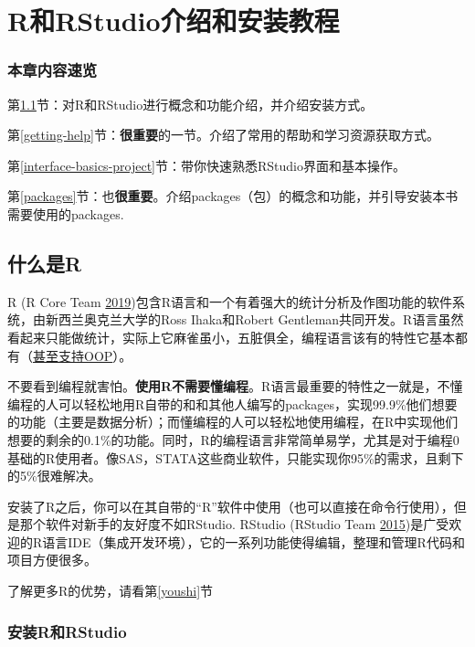 \documentclass[]{book}
\begin{document}
\hypertarget{intro-and-installation}{%
\chapter{R和RStudio介绍和安装教程}\label{intro-and-installation}}

\hypertarget{intro-overview}{%
\subsection*{本章内容速览}\label{intro-overview}}

第\ref{what-is-R}节：对R和RStudio进行概念和功能介绍，并介绍安装方式。

第\ref{getting-help}节：\textbf{很重要}的一节。介绍了常用的帮助和学习资源获取方式。

第\ref{interface-basics-project}节：带你快速熟悉RStudio界面和基本操作。

第\ref{packages}节：也\textbf{很重要}。介绍packages（包）的概念和功能，并引导安装本书需要使用的packages.

\hypertarget{what-is-R}{%
\section{什么是R}\label{what-is-R}}

R (R Core Team \protect\hyperlink{ref-R-base}{2019})包含R语言和一个有着强大的统计分析及作图功能的软件系统，由新西兰奥克兰大学的Ross Ihaka和Robert Gentleman共同开发。R语言虽然看起来只能做统计，实际上它麻雀虽小，五脏俱全，编程语言该有的特性它基本都有（\href{https://adv-r.hadley.nz/oo.html}{甚至支持OOP}）。

不要看到编程就害怕。\textbf{使用R不需要懂编程}。R语言最重要的特性之一就是，不懂编程的人可以轻松地用R自带的和和其他人编写的packages，实现99.9\%他们想要的功能（主要是数据分析）；而懂编程的人可以轻松地使用编程，在R中实现他们想要的剩余的0.1\%的功能。同时，R的编程语言非常简单易学，尤其是对于编程0基础的R使用者。像SAS，STATA这些商业软件，只能实现你95\%的需求，且剩下的5\%很难解决。

安装了R之后，你可以在其自带的``R''软件中使用（也可以直接在命令行使用），但是那个软件对新手的友好度不如RStudio. RStudio (RStudio Team \protect\hyperlink{ref-R-rstudio}{2015})是广受欢迎的R语言IDE（集成开发环境），它的一系列功能使得编辑，整理和管理R代码和项目方便很多。

了解更多R的优势，请看第\ref{youshi}节

\hypertarget{R-and-RStudio-install}{%
\subsection{安装R和RStudio}\label{R-and-RStudio-install}}
\end{document}
